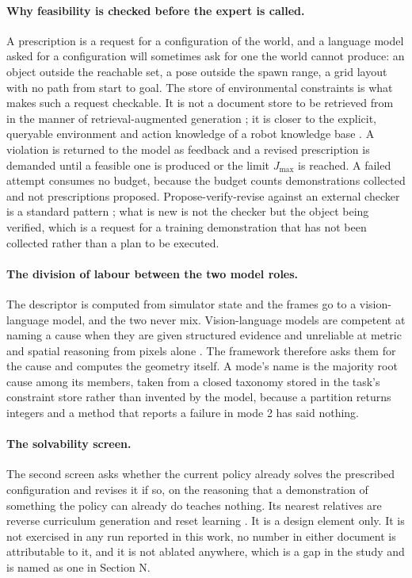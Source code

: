 \documentclass[letterpaper]{article}
\begin{document}
\paragraph{Why feasibility is checked before the expert is called.} A prescription is a
request for a configuration of the world, and a language model asked for a
configuration will sometimes ask for one the world cannot produce: an object outside
the reachable set, a pose outside the spawn range, a grid layout with no path from
start to goal. The store of environmental constraints is what makes such a request
checkable. It is not a document store to be retrieved from in the manner of
retrieval-augmented generation \citep{lewis2020rag, edge2024graphrag}; it is closer to
the explicit, queryable environment and action knowledge of a robot knowledge base
\citep{tenorth2013knowrob}. A violation is returned to the model as feedback and a
revised prescription is demanded until a feasible one is produced or the limit
$J_{\max}$ is reached. A failed attempt consumes no budget, because the budget counts
demonstrations collected and not prescriptions proposed. Propose-verify-revise against
an external checker is a standard pattern \citep{liu2023llmp, chen2024autotamp}; what
is new is not the checker but the object being verified, which is a request for a
training demonstration that has not been collected rather than a plan to be executed.

\paragraph{The division of labour between the two model roles.} The descriptor is
computed from simulator state and the frames go to a vision-language model, and the two
never mix. Vision-language models are competent at naming a cause when they are given
structured evidence \citep{duan2025aha, liu2023reflect} and unreliable at metric and
spatial reasoning from pixels alone \citep{chen2024spatialvlm, fu2024blink}. The
framework therefore asks them for the cause and computes the geometry itself. A mode's
name is the majority root cause among its members, taken from a closed taxonomy stored
in the task's constraint store rather than invented by the model, because a partition
returns integers and a method that reports a failure in mode 2 has said nothing.

\paragraph{The solvability screen.} The second screen asks whether the current policy
already solves the prescribed configuration and revises it if so, on the reasoning that
a demonstration of something the policy can already do teaches nothing. Its nearest
relatives are reverse curriculum generation \citep{florensa2017reversecurriculum} and
reset learning \citep{eysenbach2018leavenotrace}. It is a design element only. It is
not exercised in any run reported in this work, no number in either document is
attributable to it, and it is not ablated anywhere, which is a gap in the study and is
named as one in Section N.
\end{document}
